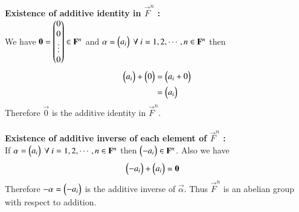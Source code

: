\documentclass[journal,12pt,twocolumn]{IEEEtran}
\begin{document}
{\bf Existence of additive identity in $\vec{F}^n$ :} \\ 
We have $\mathbf{0}=\begin{pmatrix}0\\ 0\\ \vdots\\ 0\end{pmatrix} \in \mathbf{F}^n$
and $\alpha=\begin{pmatrix}a_i\end{pmatrix} \ \forall \ i=1,2,\cdots,n  \in \mathbf{F}^n$ then
\begin{align}
	\begin{pmatrix}a_i\end{pmatrix}+\begin{pmatrix}0\end{pmatrix}
	&=\begin{pmatrix}a_i+0\end{pmatrix} \\
	&=\begin{pmatrix}a_i\end{pmatrix} 
\end{align}
Therefore $\vec{0}$ is the additive identity in 
$\vec{F}^n$.\\ \\
{\bf Existence of additive inverse of each element of $\vec{F}^n$ :} \\
If $\alpha=\begin{pmatrix}a_i\end{pmatrix} \ \forall \ i =1,2,\cdots,n \in \mathbf{F}^n$ then 
$\begin{pmatrix}-a_i\end{pmatrix} \in \mathbf{F}^n$. 
Also we have
\begin{align}
	\begin{pmatrix}-a_i\end{pmatrix}
	+\begin{pmatrix}a_i\end{pmatrix}
	&=\mathbf{0}
\end{align}
Therefore $\mathbf{-\alpha}=\begin{pmatrix}-a_i\end{pmatrix}$ is the 
additive inverse of $\vec{\alpha}$.
Thus $\vec{F}^n$ is an abelian group with respect to addition. \\
\end{document}
